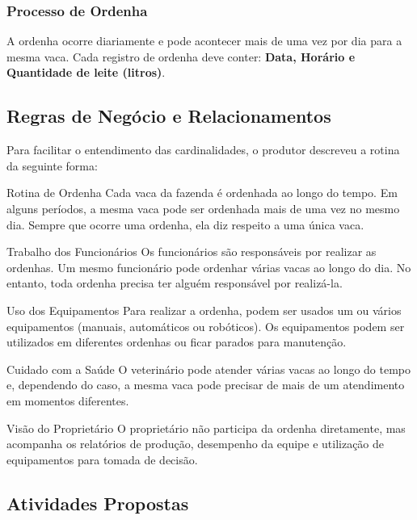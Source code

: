 \documentclass[12pt,a4paper,openright]{book}
\begin{document}
\subsubsection{Processo de Ordenha}
A ordenha ocorre diariamente e pode acontecer mais de uma vez por dia para a mesma vaca. Cada registro de ordenha deve conter: \textbf{Data, Horário e Quantidade de leite (litros)}.

\subsection{Regras de Negócio e Relacionamentos}

Para facilitar o entendimento das cardinalidades, o produtor descreveu a rotina da seguinte forma:

\begin{block}{Rotina de Ordenha}
Cada vaca da fazenda é ordenhada ao longo do tempo. Em alguns períodos, a mesma vaca pode ser ordenhada mais de uma vez no mesmo dia. Sempre que ocorre uma ordenha, ela diz respeito a uma única vaca.
\end{block}

\begin{block}{Trabalho dos Funcionários}
Os funcionários são responsáveis por realizar as ordenhas. Um mesmo funcionário pode ordenhar várias vacas ao longo do dia. No entanto, toda ordenha precisa ter alguém responsável por realizá-la.
\end{block}

\begin{block}{Uso dos Equipamentos}
Para realizar a ordenha, podem ser usados um ou vários equipamentos (manuais, automáticos ou robóticos). Os equipamentos podem ser utilizados em diferentes ordenhas ou ficar parados para manutenção.
\end{block}

\begin{block}{Cuidado com a Saúde}
O veterinário pode atender várias vacas ao longo do tempo e, dependendo do caso, a mesma vaca pode precisar de mais de um atendimento em momentos diferentes.
\end{block}

\begin{block}{Visão do Proprietário}
O proprietário não participa da ordenha diretamente, mas acompanha os relatórios de produção, desempenho da equipe e utilização de equipamentos para tomada de decisão.
\end{block}

\subsection{Atividades Propostas}
\end{document}
